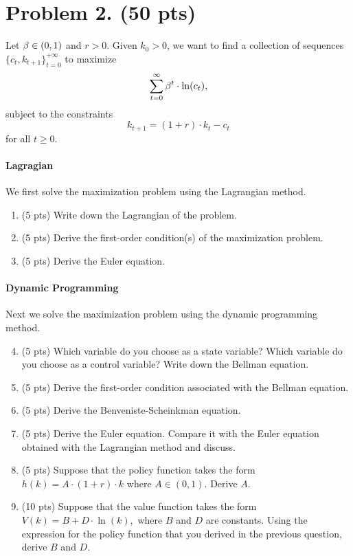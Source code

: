 \documentclass[letterpaper,12pt,leqno]{article}
\begin{document}
\section*{Problem 2. (50 pts)}

Let $\beta \in (0,1)$ and $r>0$. Given $k_{0}>0$, we want to find a collection of sequences $\{c_{t},k_{t+1}\}_{t=0}^{+\infty}$ to maximize 
\begin{equation*}
\sum_{t=0}^{\infty }\b^{t} \cdot \ln(c_{t}), 
\end{equation*}
subject to the constraints
\begin{equation*}
k_{t+1}=(1+r)\cdot k_{t}-c_{t}
\end{equation*}
for all $t\geq 0$.

\paragraph{Lagragian} We first solve the maximization problem using the Lagrangian method.

\begin{enumerate}
\item (5 pts) Write down the Lagrangian of the problem.
\item (5 pts) Derive the first-order condition(s) of the maximization problem.
\item (5 pts) Derive the Euler equation.
\end{enumerate}

\paragraph{Dynamic Programming} Next we solve the maximization problem using the dynamic programming method.

\begin{enumerate}\setcounter{enumi}{3}

\item (5 pts) Which variable do you choose as a state variable? Which variable do you choose as a control variable? Write down the Bellman equation.

\item (5 pts)  Derive the first-order condition associated with the Bellman equation.

\item (5 pts)  Derive the Benveniste-Scheinkman equation.

\item (5 pts)  Derive the Euler equation. Compare it with the Euler equation obtained with the Lagrangian method and discuss.

\item (5 pts) Suppose that the policy function takes the form $h(k)=A\cdot (1+r)\cdot k$ where $A\in (0,1) $. Derive $A$.

\item (10 pts) Suppose that the value function takes the form $V(k)=B+D\cdot \ln(k),$ where $B$ and $D$ are constants. Using the expression for the policy function that you derived in the previous question, derive $B$ and $D$.

\end{enumerate}
\end{document}
